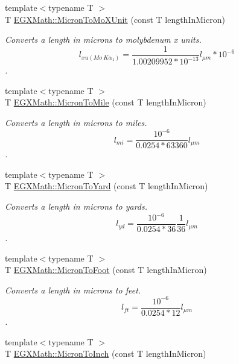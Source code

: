 \begin{DoxyCompactItemize}
{\footnotesize template$<$typename T $>$ }\\T \mbox{\hyperlink{group___e_g_x_math-_conversions-_length_conversions-_non-_s_i-_micron-_non-_s_i_ga4bdfec28657cb037fc0830a95ceb79ca}{E\+G\+X\+Math\+::\+Micron\+To\+Mo\+X\+Unit}} (const T length\+In\+Micron)
\begin{DoxyCompactList}\small\item\em Converts a length in microns to molybdenum x units. \[ l_{xu(Mo\ K\alpha_1)}=\frac{1}{1.00209952*10^{-13}} l_{\mu m} * 10^{-6}\]. \end{DoxyCompactList}\item 
{\footnotesize template$<$typename T $>$ }\\T \mbox{\hyperlink{group___e_g_x_math-_conversions-_length_conversions-_non-_s_i-_micron-_imperial_ga4a6e2d3df67af4008be36f3899c1ca19}{E\+G\+X\+Math\+::\+Micron\+To\+Mile}} (const T length\+In\+Micron)
\begin{DoxyCompactList}\small\item\em Converts a length in microns to miles. \[ l_{mi}=\frac{10^{-6}}{0.0254 * 63360} l_{\mu m} \]. \end{DoxyCompactList}\item 
{\footnotesize template$<$typename T $>$ }\\T \mbox{\hyperlink{group___e_g_x_math-_conversions-_length_conversions-_non-_s_i-_micron-_imperial_gae986c2e4dc5b38e249a8ec2fa2a3a0ea}{E\+G\+X\+Math\+::\+Micron\+To\+Yard}} (const T length\+In\+Micron)
\begin{DoxyCompactList}\small\item\em Converts a length in microns to yards. \[ l_{yd}= \frac{10^{-6}}{0.0254 * 36} \frac{1}{36} l_{\mu m} \]. \end{DoxyCompactList}\item 
{\footnotesize template$<$typename T $>$ }\\T \mbox{\hyperlink{group___e_g_x_math-_conversions-_length_conversions-_non-_s_i-_micron-_imperial_gab90a87773543173f5b774b6ccb646b5f}{E\+G\+X\+Math\+::\+Micron\+To\+Foot}} (const T length\+In\+Micron)
\begin{DoxyCompactList}\small\item\em Converts a length in microns to feet. \[ l_{ft}= \frac{10^{-6}}{0.0254 * 12} l_{\mu m} \]. \end{DoxyCompactList}\item 
{\footnotesize template$<$typename T $>$ }\\T \mbox{\hyperlink{group___e_g_x_math-_conversions-_length_conversions-_non-_s_i-_micron-_imperial_ga12a0ceda3109e1f972dd62a797c78503}{E\+G\+X\+Math\+::\+Micron\+To\+Inch}} (const T length\+In\+Micron)

\end{DoxyCompactItemize}
